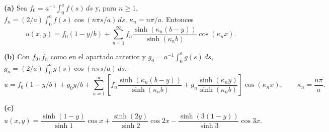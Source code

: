 \noindent\textbf{(a)} Sea $f_0=a^{-1}\int_0^af(s)\,ds$ y, para $n\geq1$,
$f_n=(2/a)\int_0^af(s)\cos(n\pi s/a)\,ds$, $\kappa_n=n\pi/a$.
Entonces
\[
u(x,y)=f_0(1-y/b)+\sum_{n=1}^{\infty}
f_n\frac{\sinh(\kappa_n(b-y))}{\sinh(\kappa_nb)}\cos(\kappa_nx).
\]

\noindent\textbf{(b)} Con $f_0,f_n$ como en el apartado anterior y
$g_0=a^{-1}\int_0^ag(s)\,ds$,
$g_n=(2/a)\int_0^ag(s)\cos(n\pi s/a)\,ds$,
\[
u=f_0(1-y/b)+g_0y/b+\sum_{n=1}^{\infty}
\left[f_n\frac{\sinh(\kappa_n(b-y))}{\sinh(\kappa_nb)}
+g_n\frac{\sinh(\kappa_n y)}{\sinh(\kappa_nb)}\right]\cos(\kappa_nx),
\qquad \kappa_n=\frac{n\pi}{a}.
\]

\noindent\textbf{(c)} \[
u(x,y)=\frac{\sinh(1-y)}{\sinh1}\cos x
+\frac{\sinh(2y)}{\sinh2}\cos2x
-\frac{\sinh(3(1-y))}{\sinh3}\cos3x.
\]
